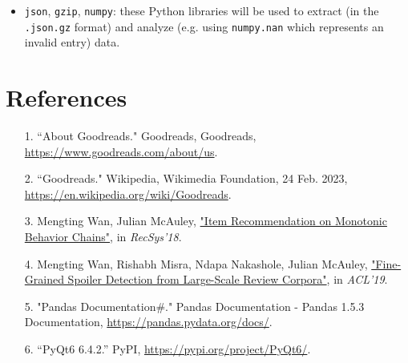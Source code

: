 \documentclass[fontsize=11pt]{article}
\begin{document}
\begin{itemize}
\begin{itemize}
\item \texttt{json}, \texttt{gzip}, \texttt{numpy}: these Python libraries will be used to extract (in the \texttt{.json.gz} format) and analyze (e.g. using \texttt{numpy.nan} which represents an invalid entry) data.


\end{itemize}
\end{itemize}

\section*{References}

\begin{enumerate}
    \item[1.]
    ``About Goodreads." Goodreads, Goodreads, \url{https://www.goodreads.com/about/us}.
    \item[2.]
    ``Goodreads." Wikipedia, Wikimedia Foundation, 24 Feb. 2023, \url{https://en.wikipedia.org/wiki/Goodreads}. 
    \item[3.]
    Mengting Wan, Julian McAuley, \href{https://www.google.com/url?q=https%3A%2F%2Fgithub.com%2FMengtingWan%2Fmengtingwan.github.io%2Fraw%2Fmaster%2Fpaper%2Frecsys18_mwan.pdf&sa=D&sntz=1&usg=AOvVaw0HcX6gU1ENhk7fbCXXbCiy}{"Item Recommendation on Monotonic Behavior Chains"}, in \textit{RecSys'18}.
    \item[4.]
    Mengting Wan, Rishabh Misra, Ndapa Nakashole, Julian McAuley, \href{https://www.google.com/url?q=https%3A%2F%2Fwww.aclweb.org%2Fanthology%2FP19-1248&sa=D&sntz=1&usg=AOvVaw1G1ZlQ7oe0NDtqeI8gN2Nf}{"Fine-Grained Spoiler Detection from Large-Scale Review Corpora"}, in \textit{ACL'19}.
    \item[5.]
    "Pandas Documentation\#." Pandas Documentation - Pandas 1.5.3 Documentation, \url{https://pandas.pydata.org/docs/}.
    \item[6.]
    “PyQt6 6.4.2.” PyPI, \url{https://pypi.org/project/PyQt6/}.
\end{enumerate}
\end{document}
